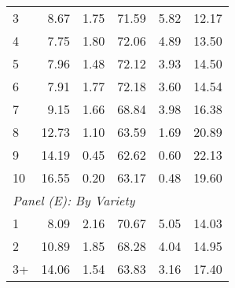 \begin{table}
\begin{tabular}{lrrrrr}
		3       &            8.67 &       1.75 &     71.59 &      5.82 &            12.17 \\
		4       &            7.75 &       1.80 &     72.06 &      4.89 &            13.50 \\
		5       &            7.96 &       1.48 &     72.12 &      3.93 &            14.50 \\
		6       &            7.91 &       1.77 &     72.18 &      3.60 &            14.54 \\
		7       &            9.15 &       1.66 &     68.84 &      3.98 &            16.38 \\
		8       &           12.73 &       1.10 &     63.59 &      1.69 &            20.89 \\
		9       &           14.19 &       0.45 &     62.62 &      0.60 &            22.13 \\
		10      &           16.55 &       0.20 &     63.17 &      0.48 &            19.60 \\ \hline
		\multicolumn{6}{l}{\textit{Panel (E): By Variety}}                                \\ \hline
		1       &            8.09 &       2.16 &     70.67 &      5.05 &            14.03 \\
		2       &           10.89 &       1.85 &     68.28 &      4.04 &            14.95 \\
		3+      &           14.06 &       1.54 &     63.83 &      3.16 &            17.40 \\ \hline\hline
	\end{tabular}
\end{table}

